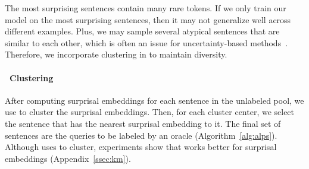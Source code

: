 The most surprising sentences contain many rare tokens.
If we only train our model on the most surprising sentences, then it may
not generalize well across different examples.
Plus, we may sample several atypical
sentences that are similar to each other, which is often an issue for
uncertainty-based methods~\citep{kirsch-2019}.  Therefore, we incorporate clustering in \alps{} to
maintain diversity.

\paragraph{\km~Clustering}
After computing surprisal embeddings for each sentence in the unlabeled pool, we
use \km{} to cluster the surprisal embeddings.  Then, for each
cluster center, we select the
sentence that has the nearest surprisal embedding to it.  The final set of sentences
are the queries to be labeled by an oracle (Algorithm~\ref{alg:alps}).  Although
\badge{} uses \kmpp{} to cluster, experiments show that \km{} works better for
surprisal embeddings (Appendix~\ref{ssec:km}).





